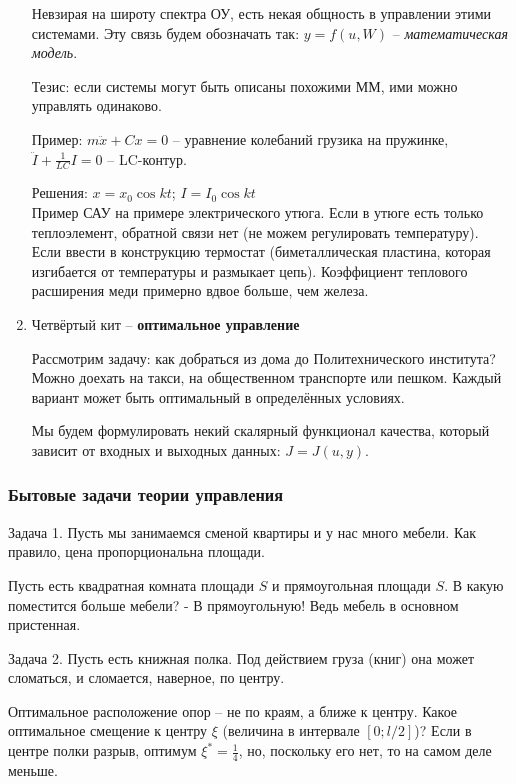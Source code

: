 \documentclass[main.tex]{subfiles}
\begin{document}
\begin{enumerate}
	Невзирая на широту спектра ОУ, есть некая общность в управлении этими системами. Эту связь будем обозначать так: $ y = f(u, W) $ -- \emph{математическая модель}.

	Тезис: если системы могут быть описаны похожими ММ, ими можно управлять одинаково.

	Пример: $ m\ddot{x} + Cx = 0 $ -- уравнение колебаний грузика на пружинке, $ \ddot I + \frac{1}{LC}I = 0 $ -- LC-контур.

	Решения: $ x = x_0 \cos kt $; $ I = I_0 \cos kt $ \\


	Пример САУ на примере электрического утюга. Если в утюге есть только теплоэлемент, обратной связи нет (не можем регулировать температуру).
	Если ввести в конструкцию термостат (биметаллическая пластина, которая изгибается от температуры и размыкает цепь). Коэффициент теплового расширения меди примерно вдвое больше, чем железа.

	\item Четвёртый кит -- \textbf{оптимальное управление}

	Рассмотрим задачу: как добраться из дома до Политехнического института?
	Можно доехать на такси, на общественном транспорте или пешком.
	Каждый вариант может быть оптимальный в определённых условиях.

	Мы будем формулировать некий скалярный функционал качества, который зависит от входных и выходных данных: $ J = J(u, y) $.

\end{enumerate}

\subsubsection{Бытовые задачи теории управления}

Задача 1. Пусть мы занимаемся сменой квартиры и у нас много мебели. Как правило, цена пропорциональна площади.

Пусть есть квадратная комната площади $ S $ и прямоугольная площади $ S $.
В какую поместится больше мебели? - В прямоугольную! Ведь мебель в основном пристенная.

Задача 2. Пусть есть книжная полка. Под действием груза (книг) она может сломаться, и сломается, наверное, по центру.

Оптимальное расположение опор -- не по краям, а ближе к центру. Какое оптимальное смещение к центру $ \xi $ (величина в интервале $ [0; l/2] $)? Если в центре полки разрыв, оптимум $ \xi^* = \frac{1}{4} $, но, поскольку его нет, то на самом деле меньше.
\end{document}
